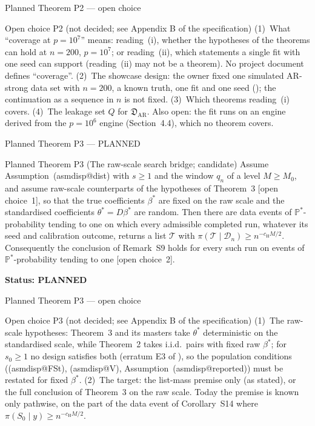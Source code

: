 \documentclass[aspectratio=169]{beamer}
\makeatletter
\newcommand{\asmdisp}[1]{\csname asmdisp@#1\endcsname}
\newcommand{\as}[1]{\textup{(\asmdisp{#1})}}
\renewcommand{\P}{\mathbb{P}}
\newcommand{\bstar}{\beta^*}
\newcommand{\tstar}{\theta^*}
\newcommand{\Sz}{S_0}
\newcommand{\sz}{s_0}
\newcommand{\Dn}{\mathcal D_n}
\makeatother
\begin{document}
\begin{frame}{Planned Theorem P2 --- open choice}
\small
\begin{block}{Open choice P2 (not decided; see Appendix B of the specification)}
(1)~What ``coverage at $p=10^7$'' means: reading~(i), whether the hypotheses of the theorems can hold at
$n=200$, $p=10^7$; or reading~(ii), which statements a single fit with one seed can support (reading~(ii) may not be a
theorem). No project document defines ``coverage''. (2)~The showcase design: the owner fixed one simulated AR-strong data set with $n=200$, a known truth, one fit and one
seed (); the continuation as a sequence in $n$ is not fixed. (3)~Which theorems reading~(i) covers. (4)~The leakage
set $Q$ for $\mathfrak D_{\mathrm{AR}}$. Also open: the fit runs on an engine derived from the $p=10^6$ engine
(Section~4.4), which no theorem covers.
\end{block}
\end{frame}

\begin{frame}{Planned Theorem P3 --- PLANNED}
\small
\begin{alertblock}{Planned Theorem P3 (The raw-scale search bridge; candidate)}
Assume Assumption~\as{dist} with $s\ge1$ and the window $q_n$ of a level $M\ge M_0$, and assume raw-scale counterparts of
the hypotheses of Theorem~3 \textup{[open choice~1]}, so that the true coefficients $\bstar$ are fixed on
the raw scale and the standardised coefficients $\tstar=D\bstar$ are random. Then there are data events of
$\P^*$-probability tending to one on which every admissible completed run, whatever its seed and calibration outcome,
returns a list $\mathcal T$ with $\pi(\mathcal T\mid\Dn)\ge n^{-c_{\mathrm H}M/2}$. Consequently the conclusion of
Remark~S9 holds for every such run on events of $\P^*$-probability tending to one
\textup{[open choice~2]}.
\end{alertblock}
\medskip\noindent\textbf{Status: PLANNED}
\end{frame}

\begin{frame}{Planned Theorem P3 --- open choice}
\small
\begin{block}{Open choice P3 (not decided; see Appendix B of the specification)}
(1)~The raw-scale hypotheses: Theorem~3 and its masters take $\tstar$ deterministic on the
standardised scale, while Theorem~2 takes i.i.d.\ pairs with fixed raw $\bstar$; for $\sz\ge1$ no design
satisfies both (erratum E3 of ), so the population conditions (\as{FSt}, \as{V}, Assumption~\as{reported})
must be restated for fixed $\bstar$. (2)~The target: the list-mass premise only (as stated), or the full conclusion of
Theorem~3 on the raw scale. Today the premise is known only pathwise, on the part of the data event of
Corollary~S14 where $\pi(\Sz\mid y)\ge n^{-c_{\mathrm H}M/2}$.
\end{block}
\end{frame}
\end{document}
